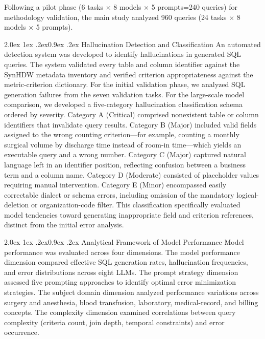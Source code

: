 \documentclass[10pt,twocolumn]{article}
\makeatletter
\renewcommand\subsection{\@startsection{subsection}{2}{\z@}%
  {2.0ex \@plus 1ex \@minus .2ex}{0.9ex \@plus .2ex}%
  {\normalfont\normalsize\bfseries}}
\makeatother
\begin{document}
\noindent Following a pilot phase (6 tasks $\times$ 8 models $\times$ 5
prompts=240 queries) for methodology validation, the main study analyzed 960
queries (24 tasks $\times$ 8 models $\times$ 5 prompts).

\subsection{Hallucination Detection and Classification}
An automated detection system was developed to identify hallucinations in
generated SQL queries. The system validated every table and column identifier
against the SynHDW metadata inventory and verified criterion appropriateness
against the metric-criterion dictionary. For the initial validation phase, we
analyzed SQL generation failures from the seven validation tasks. For the
large-scale model comparison, we developed a five-category hallucination
classification schema ordered by severity. Category A (Critical) comprised
nonexistent table or column identifiers that invalidate query results. Category
B (Major) included valid fields assigned to the wrong counting criterion---for
example, counting a monthly surgical volume by discharge time instead of room-in
time---which yields an executable query and a wrong number. Category C (Major)
captured natural language left in an identifier position, reflecting confusion
between a business term and a column name. Category D (Moderate) consisted of
placeholder values requiring manual intervention. Category E (Minor) encompassed
easily correctable dialect or schema errors, including omission of the mandatory
logical-deletion or organization-code filter. This classification specifically
evaluated model tendencies toward generating inappropriate field and criterion
references, distinct from the initial error analysis.

\subsection{Analytical Framework of Model Performance}
Model performance was evaluated across four dimensions. The model performance
dimension compared effective SQL generation rates, hallucination frequencies,
and error distributions across eight LLMs. The prompt strategy dimension
assessed five prompting approaches to identify optimal error minimization
strategies. The subject domain dimension analyzed performance variations across
surgery and anesthesia, blood transfusion, laboratory, medical-record, and
billing concepts. The complexity dimension examined correlations between query
complexity (criteria count, join depth, temporal constraints) and error
occurrence.
\end{document}
